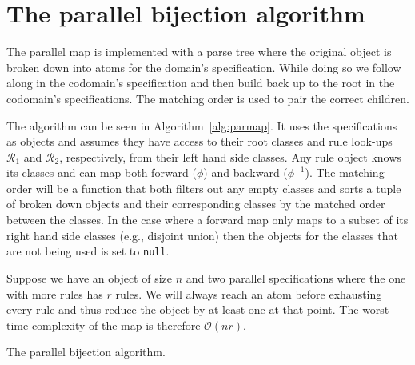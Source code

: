 \section{The parallel bijection algorithm}
The parallel map is implemented with a parse tree where the original object is broken down into atoms for the domain's specification. While doing so we follow along in the codomain's specification and then build back up to the root in the codomain's specifications. The matching order is used to pair the correct children.

The algorithm can be seen in Algorithm~\ref{alg:parmap}. It uses the specifications as objects and assumes they have access to their root classes and rule look-ups $\mathscr{R}_1$ and $\mathscr{R}_2$, respectively, from their left hand side classes. Any rule object knows its classes and can map both forward ($\phi$) and backward ($\phi^{-1}$). The matching order will be a function that both filters out any empty classes and sorts a tuple of broken down objects and their corresponding classes by the matched order between the classes. In the case where a forward map only maps to a subset of its right hand side classes (e.g., disjoint union) then the objects for the classes that are not being used is set to \texttt{null}.

Suppose we have an object of size $n$ and two parallel specifications where the one with more rules has $r$ rules. We will always reach an atom before exhausting every rule and thus reduce the object by at least one at that point. The worst time complexity of the map is therefore $\mathcal{O}(nr)$.

\begin{algorithm}[ht!]

\caption{The parallel bijection algorithm.}
\label{alg:parmap}
\end{algorithm}